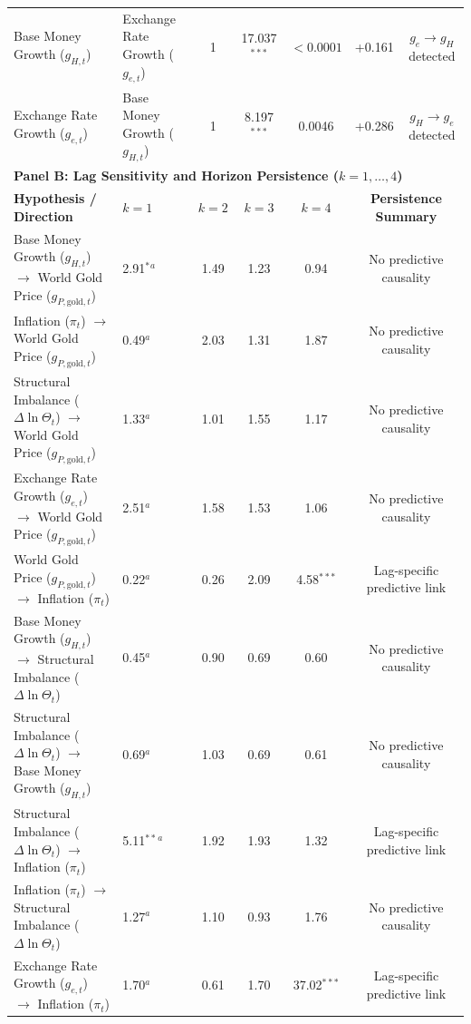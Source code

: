 \begin{table}[htbp]
{\begin{tabular}{llccccc}
Base Money Growth ($g_{H,t}$) & Exchange Rate Growth ($g_{e,t}$) & 1 & 17.037$^{***}$ & $< 0.0001$ & +0.161 & $g_e \to g_H$ detected \\
Exchange Rate Growth ($g_{e,t}$) & Base Money Growth ($g_{H,t}$) & 1 & 8.197$^{***}$ & 0.0046 & +0.286 & $g_H \to g_e$ detected \\
\midrule
\multicolumn{7}{l}{\textbf{Panel B: Lag Sensitivity and Horizon Persistence ($k = 1, \dots, 4$)}} \\
\midrule
\textbf{Hypothesis / Direction} & \textbf{$k = 1$} & \textbf{$k = 2$} & \textbf{$k = 3$} & \textbf{$k = 4$} & \multicolumn{2}{c}{\textbf{Persistence Summary}} \\
\midrule
Base Money Growth ($g_{H,t}$) $\to$ World Gold Price ($g_{P,\text{gold},t}$) & 2.91$^{*}$$^a$ & 1.49 & 1.23 & 0.94 & \multicolumn{2}{c}{No predictive causality} \\
Inflation ($\pi_t$) $\to$ World Gold Price ($g_{P,\text{gold},t}$) & 0.49$^a$ & 2.03 & 1.31 & 1.87 & \multicolumn{2}{c}{No predictive causality} \\
Structural Imbalance ($\Delta \ln \Theta_t$) $\to$ World Gold Price ($g_{P,\text{gold},t}$) & 1.33$^a$ & 1.01 & 1.55 & 1.17 & \multicolumn{2}{c}{No predictive causality} \\
Exchange Rate Growth ($g_{e,t}$) $\to$ World Gold Price ($g_{P,\text{gold},t}$) & 2.51$^a$ & 1.58 & 1.53 & 1.06 & \multicolumn{2}{c}{No predictive causality} \\
World Gold Price ($g_{P,\text{gold},t}$) $\to$ Inflation ($\pi_t$) & 0.22$^a$ & 0.26 & 2.09 & 4.58$^{***}$ & \multicolumn{2}{c}{Lag-specific predictive link} \\
Base Money Growth ($g_{H,t}$) $\to$ Structural Imbalance ($\Delta \ln \Theta_t$) & 0.45$^a$ & 0.90 & 0.69 & 0.60 & \multicolumn{2}{c}{No predictive causality} \\
Structural Imbalance ($\Delta \ln \Theta_t$) $\to$ Base Money Growth ($g_{H,t}$) & 0.69$^a$ & 1.03 & 0.69 & 0.61 & \multicolumn{2}{c}{No predictive causality} \\
Structural Imbalance ($\Delta \ln \Theta_t$) $\to$ Inflation ($\pi_t$) & 5.11$^{**}$$^a$ & 1.92 & 1.93 & 1.32 & \multicolumn{2}{c}{Lag-specific predictive link} \\
Inflation ($\pi_t$) $\to$ Structural Imbalance ($\Delta \ln \Theta_t$) & 1.27$^a$ & 1.10 & 0.93 & 1.76 & \multicolumn{2}{c}{No predictive causality} \\
Exchange Rate Growth ($g_{e,t}$) $\to$ Inflation ($\pi_t$) & 1.70$^a$ & 0.61 & 1.70 & 37.02$^{***}$ & \multicolumn{2}{c}{Lag-specific predictive link} \\

\end{tabular}}
\end{table}
